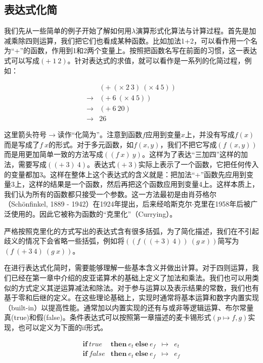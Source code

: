 \documentclass{article}
\begin{document}
\subsection{表达式化简}
我们先从一些简单的例子开始了解如何用$\lambda$演算形式化算法与计算过程。首先是加减乘除四则运算，我们把它们也看成某种函数。比如加法1+2，可以看作用一个名为“+”的函数，作用到1和2两个变量上。按照把函数名写在前面的习惯，这一表达式可以写成$(+\ 1\ 2)$。针对表达式的求值，就可以看作是一系列的化简过程，例如：

\[
\begin{array}{ll}
    & (+\ (\times\ 2\ 3)\ (\times\ 4\ 5)) \\
\to & (+\ 6\ (\times\ 4\ 5)) \\
\to & (+\ 6\ 20) \\
\to & 26
\end{array}
\]

这里箭头符号$\to$读作“化简为”。注意到函数$f$应用到变量$x$上，并没有写成$f(x)$而是写成了$f\ x$的形式。对于多元函数，如$f(x, y)$，我们不把它写成$(f\ (x, y))$而是用更加简单一致的方法写成$((f\ x)\ y)$。这样为了表达“三加四”这样的加法，需要写成$((+\ 3)\ 4)$。表达式$(+\ 3)$实际上表示了一个函数，它把任何传入的变量都加3。这样在整体上这个表达式的含义就是：把加法“+”函数先应用到变量3上，这样的结果是一个函数，然后再把这个函数应用到变量4上。这样本质上，我们认为所有的函数都只接受一个参数。这一方法最初是由肖芬格尔（Schönfinkel, 1889 - 1942）在1924年提出，后来经哈斯克尔$\cdot$克里在1958年后被广泛使用的。因此它被称为函数的“克里化”（Currying）\cite{SPJ1987}。

严格按照克里化的方式写出的表达式含有很多括弧，为了简化描述，我们在不引起歧义的情况下会省略一些括弧，例如将$((f\ ((+\ 3)\ 4))\ (g\ x))$简写为$(f\ (+\ 3\ 4)\ (g\ x))$。

在进行表达式化简时，需要能够理解一些基本含义并做出计算。对于四则运算，我们已经在第一章中介绍的皮亚诺算术的基础上定义了加法和乘法。我们也可以用类似的方式定义其逆运算减法和除法。对于参与运算以及表示结果的常数，我们也有基于零和后继的定义。在这些理论基础上，实现时通常将基本运算和数字内置实现（built-in）以提高性能。通常加以内置实现的还有与或非等逻辑运算、布尔常量真(true)和假(false)。条件表达式可以按照第一章描述的麦卡锡形式$(p \mapsto f, g)$实现，也可以定义为下面的if形式。

\[
\begin{array}{llcl}
\textbf{if}\ true\! & \textbf{then}\ e_t\ \textbf{else}\ e_f & \mapsto & e_t \\
\textbf{if}\ false\! & \textbf{then}\ e_t\ \textbf{else}\ e_f & \mapsto & e_f
\end{array}
\]
\end{document}
